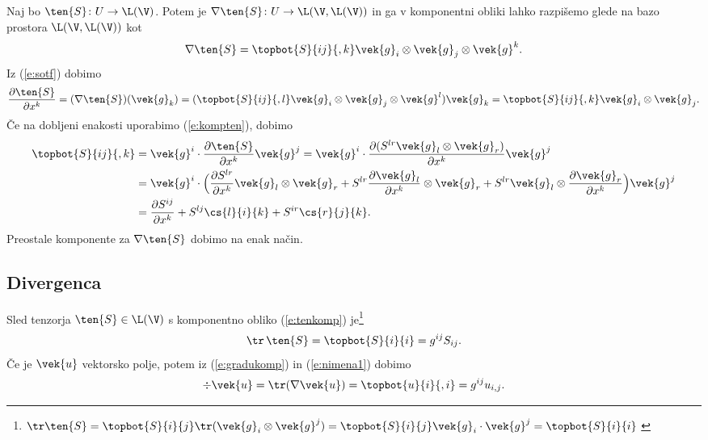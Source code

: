 Naj bo $\ten{S}\colon U\to\L(\V)$. Potem je $\nabla\ten{S}\colon U\to\L(\V,\L(\V))$
in ga v komponentni obliki lahko razpišemo glede na bazo prostora $\L(\V,\L(\V))$ kot
\[ \nabla\ten{S}=\topbot{S}{ij}{,k}\vek{g}_i\otimes\vek{g}_j\otimes\vek{g}^k. \]
Iz (\ref{e:sotf}) dobimo
\[
	\frac{\partial\ten{S}}{\partial x^k}=(\nabla\ten{S})(\vek{g}_k)=
	(\topbot{S}{ij}{,l}\vek{g}_i\otimes\vek{g}_j\otimes\vek{g}^l)\vek{g}_k=
	\topbot{S}{ij}{,k}\vek{g}_i\otimes\vek{g}_j.
\]
Če na dobljeni enakosti uporabimo (\ref{e:kompten}), dobimo
\begin{align*}
	\topbot{S}{ij}{,k}&=\vek{g}^i\cdot\frac{\partial\ten{S}}{\partial x^k}\vek{g}^j=
	\vek{g}^i\cdot\frac{\partial(S^{lr}\vek{g}_l\otimes\vek{g}_r)}{\partial x^k}\vek{g}^j \\
	&=\vek{g}^i\cdot\Big(
	\frac{\partial S^{lr}}{\partial x^k}\vek{g}_l\otimes\vek{g}_r+
	S^{lr}\frac{\partial\vek{g}_l}{\partial x^k}\otimes\vek{g}_r+
	S^{lr}\vek{g}_l\otimes\frac{\partial\vek{g}_r}{\partial x^k}
	\Big)\vek{g}^j \\
	&=\frac{\partial S^{ij}}{\partial x^k}+S^{lj}\cs{l}{i}{k}+S^{ir}\cs{r}{j}{k}.
\end{align*}
Preostale komponente za $\nabla\ten{S}$ dobimo na enak način.


\subsection{Divergenca}


Sled tenzorja $\ten{S}\in\L(\V)$ s komponentno obliko (\ref{e:tenkomp})
je\footnote{$\tr\ten{S}=\topbot{S}{i}{j}\tr(\vek{g}_i\otimes\vek{g}^j)=
\topbot{S}{i}{j}\vek{g}_i\cdot\vek{g}^j=\topbot{S}{i}{i}$ \cite[str.~249]{liu}}
\[ \tr\,\ten{S}=\topbot{S}{i}{i}=g^{ij}S_{ij}. \]
Če je $\vek{u}$ vektorsko polje, potem iz (\ref{e:gradukomp}) in (\ref{e:nimena1}) dobimo
\begin{equation} \label{e:divu}
	\div\vek{u} = \tr(\nabla\vek{u}) = \topbot{u}{i}{,i} = g^{ij}u_{i,j}.
\end{equation}


